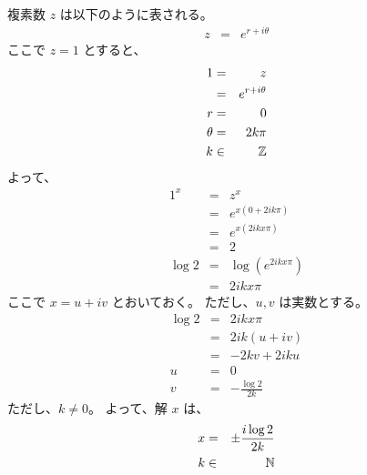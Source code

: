 複素数 $z$ は以下のように表される。
  \begin{eqnarray}
    z & = & e^{r + i\theta}
  \end{eqnarray}
ここで $z=1$ とすると、
  \begin{eqnarray}
    1
      & = &
        z
  \\  
      & = &
        e^{r + i\theta}
  \\
    r
      & = &
        0
  \\
    \theta
      & = &
        2 k \pi
  \\
    k
      & \in &
        \mathbb{Z}
  \end{eqnarray}
よって、
  \begin{eqnarray}
    1^x
      & = &
        z^x
  \\  
      & = &
        e^{x (0 + 2 i k \pi)}
  \\
      & = &
        e^{x (2 i k x \pi)}
  \\
      & = &
        2
  \\
    \log 2 
      & = &
        \log\left(e^{2 i k x \pi}\right)
  \\
      & = &
        2 i k x \pi
  \end{eqnarray}
ここで $x = u + i v$ とおいておく。
ただし、$u,v$ は実数とする。
  \begin{eqnarray}
    \log 2 
      & = &
        2 i k x \pi
  \\
      & = &
        2 i k (u + iv)
  \\
      & = &
        - 2 k v + 2 i k u
  \\
    u
      & = &
        0
  \\
    v
      & = &
        - \frac{\log 2}{2 k}
  \end{eqnarray}
ただし、$k \ne 0$。
よって、解 $x$ は、
  \begin{eqnarray}
    x & = &
        \pm \frac{i \log 2}{2 k}
  \\
    k & \in & \mathbb{N}
  \end{eqnarray}



